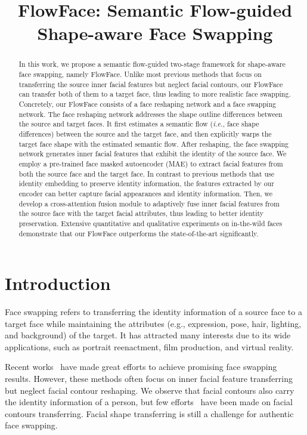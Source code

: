 \title{FlowFace: Semantic Flow-guided Shape-aware Face Swapping}



\maketitle

\begin{abstract}
In this work, we propose a semantic flow-guided two-stage framework for shape-aware face swapping, namely FlowFace.
Unlike most previous methods that focus on transferring the source inner facial features but neglect facial contours, our FlowFace can transfer both of them to a target face, thus leading to more realistic face swapping.
Concretely, our FlowFace consists of a face reshaping network and a face swapping network. 
The face reshaping network addresses the shape outline differences between the source and target faces. 
It first estimates a semantic flow (\emph{i.e.}, face shape differences) between the source and the target face, and then explicitly warps the target face shape with the estimated semantic flow. 
After reshaping, the face swapping network generates inner facial features that exhibit the identity of the source face. 
We employ a pre-trained face masked autoencoder (MAE) to extract facial features from both the source face and the target face. 
In contrast to previous methods that use identity embedding to preserve identity information, the features extracted by our encoder can better capture facial appearances and identity information. Then, we develop a cross-attention fusion module to adaptively fuse inner facial features from the source face with the target facial attributes, thus leading to better identity preservation.
Extensive quantitative and qualitative experiments on in-the-wild faces demonstrate that our FlowFace outperforms the state-of-the-art significantly.
\end{abstract}

\section{Introduction}
Face swapping refers to transferring the identity information of a source face to a target face while maintaining the attributes (e.g., expression, pose, hair, lighting, and background) of the target. 
It has attracted many interests due to its wide applications, such as portrait reenactment, film production, and virtual reality. 

Recent works~\cite{li2019faceshifter,chen2020simswap,xu2021facecontroller,li2021faceinpainter} have made great efforts to achieve promising face swapping results. 
However, these methods often focus on inner facial feature transferring but neglect facial contour reshaping.
We observe that facial contours also carry the identity information of a person, but few efforts~\cite{wang2021hififace} have been made on facial contours transferring. 
Facial shape transferring is still a challenge for authentic face swapping.

